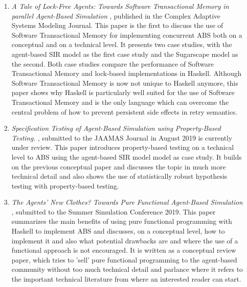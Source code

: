 \begin{enumerate}
	\item \textit{A Tale of Lock-Free Agents: Towards Software Transactional Memory in parallel Agent-Based Simulation} \cite{thaler_tale_2018}, published in the Complex Adaptive Systems Modeling Journal. This paper is the first to discuss the use of Software Transactional Memory for implementing concurrent ABS both on a conceptual and on a technical level. It presents two case studies, with the agent-based SIR model as the first case study and the Sugarscape model as the second. Both case studies compare the performance of Software Transactional Memory and lock-based implementations in Haskell. Although Software Transactional Memory is now not unique to Haskell anymore, this paper shows why Haskell is particularly well suited for the use of Software Transactional Memory and is the only language which can overcome the central problem of how to prevent persistent side effects in retry semantics.

	\item \textit{Specification Testing of Agent-Based Simulation using Property-Based Testing.} \cite{thaler_specification_2019}, submitted to the JAAMAS Journal in August 2019 is currently under review.
This paper introduces property-based testing on a technical level to ABS using the agent-based SIR model model as case study. It builds on the previous conceptual paper and discusses the topic in much more technical detail and also shows the use of statistically robust hypothesis testing with property-based testing.
	
	\item \textit{The Agents' New Clothes? Towards Pure Functional Agent-Based Simulation} \cite{thaler_agents_2019}, submitted to the Summer Simulation Conference 2019. This paper summarizes the main benefits of using pure functional programming with Haskell to implement ABS and discusses, on a conceptual level, how to implement it and also what potential drawbacks are and where the use of a functional approach is not encouraged. It is written as a conceptual review paper, which tries to 'sell' pure functional programming to the agent-based community without too much technical detail and parlance where it refers to the important technical literature from where an interested reader can start.
\end{enumerate}